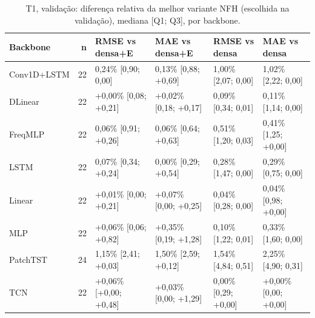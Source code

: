 \begin{table}[htbp]
\centering
\scriptsize
\setlength{\tabcolsep}{2pt}
\caption{T1, valida\c{c}\~ao: diferen\c{c}a relativa da melhor variante NFH (escolhida na valida\c{c}\~ao), mediana [Q1; Q3], por backbone.}\label{tab:t1_bb_val}
\begin{tabular}{lrllll}
\toprule
Backbone & n & \shortstack[l]{RMSE vs\\ densa+E} & \shortstack[l]{MAE vs\\ densa+E} & \shortstack[l]{RMSE vs\\ densa} & \shortstack[l]{MAE vs\\ densa} \\ \midrule
Conv1D+LSTM & 22 & \textminus{}0,24\% [\textminus{}0,90; \textminus{}0,00] & \textminus{}0,13\% [\textminus{}0,88; +0,69] & \textminus{}1,00\% [\textminus{}2,07; \textminus{}0,00] & \textminus{}1,02\% [\textminus{}2,22; \textminus{}0,00] \\
DLinear & 22 & +0,00\% [\textminus{}0,08; +0,21] & +0,02\% [\textminus{}0,18; +0,17] & \textminus{}0,09\% [\textminus{}0,34; \textminus{}0,01] & \textminus{}0,11\% [\textminus{}1,14; \textminus{}0,00] \\
FreqMLP & 22 & \textminus{}0,06\% [\textminus{}0,91; +0,26] & \textminus{}0,06\% [\textminus{}0,64; +0,63] & \textminus{}0,51\% [\textminus{}1,20; \textminus{}0,03] & \textminus{}0,41\% [\textminus{}1,25; +0,00] \\
LSTM & 22 & \textminus{}0,07\% [\textminus{}0,34; +0,24] & \textminus{}0,00\% [\textminus{}0,29; +0,54] & \textminus{}0,28\% [\textminus{}1,47; \textminus{}0,00] & \textminus{}0,29\% [\textminus{}0,75; \textminus{}0,00] \\
Linear & 22 & +0,01\% [\textminus{}0,00; +0,21] & +0,07\% [\textminus{}0,00; +0,25] & \textminus{}0,04\% [\textminus{}0,28; \textminus{}0,00] & \textminus{}0,04\% [\textminus{}0,98; +0,00] \\
MLP & 22 & +0,06\% [\textminus{}0,06; +0,82] & +0,35\% [\textminus{}0,19; +1,28] & \textminus{}0,10\% [\textminus{}1,22; \textminus{}0,01] & \textminus{}0,33\% [\textminus{}1,60; \textminus{}0,00] \\
PatchTST & 24 & \textminus{}1,15\% [\textminus{}2,41; +0,03] & \textminus{}1,50\% [\textminus{}2,59; +0,12] & \textminus{}1,54\% [\textminus{}4,84; \textminus{}0,51] & \textminus{}2,25\% [\textminus{}4,90; \textminus{}0,31] \\
TCN & 22 & +0,06\% [+0,00; +0,48] & +0,03\% [\textminus{}0,00; +1,29] & \textminus{}0,00\% [\textminus{}0,29; +0,00] & +0,00\% [\textminus{}0,00; +0,00] \\

\end{tabular}
\end{table}
